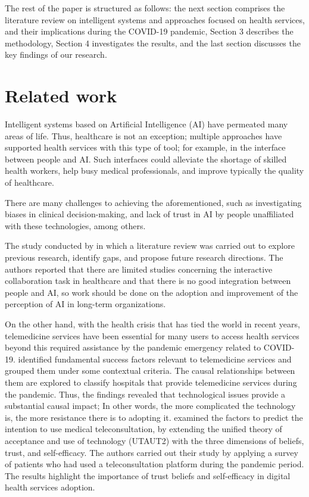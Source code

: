 \documentclass[sustainability,article,submit,pdftex,moreauthors]{Definitions/mdpi}
\begin{document}
The rest of the paper is structured as follows: the next section comprises the literature review on intelligent systems and approaches focused on health services, and their implications during the COVID-19 pandemic, Section 3 describes the methodology, Section 4 investigates the results, and the last section discusses the key findings of our research.

\section{Related work}

Intelligent systems based on Artificial Intelligence (AI) have permeated many areas of life. Thus, healthcare is not an exception; multiple approaches have supported health services with this type of tool; for example, in the interface between people and AI. Such interfaces could alleviate the shortage of skilled health workers, help busy medical professionals, and improve typically the quality of healthcare. 

There are many challenges to achieving the aforementioned, such as investigating biases in clinical decision-making, and lack of trust in AI by people unaffiliated with these technologies, among others. 

The study conducted by \citet{lai2021human} in which a literature review was carried out to explore previous research, identify gaps, and propose future research directions. The authors reported that there are limited studies concerning the interactive collaboration task in healthcare and that there is no good integration between people and AI, so work should be done on the adoption and improvement of the perception of AI in long-term organizations.

On the other hand, with the health crisis that has tied the world in recent years, telemedicine services have been essential for many users to access health services beyond this required assistance by the pandemic emergency related to COVID-19. \citet{chauhan2022implications} identified fundamental success factors relevant to telemedicine services and grouped them under some contextual criteria. The causal relationships between them are explored to classify hospitals that provide telemedicine services during the pandemic. Thus, the findings revealed that technological issues provide a substantial causal impact; In other words, the more complicated the technology is, the more resistance there is to adopting it. \citet{baudier2022digital} examined the factors to predict the intention to use medical teleconsultation, by extending the unified theory of acceptance and use of technology (UTAUT2) with the three dimensions of beliefs, trust, and self-efficacy. The authors carried out their study by applying a survey of patients who had used a teleconsultation platform during the pandemic period. The results highlight the importance of trust beliefs and self-efficacy in digital health services adoption.
\end{document}
